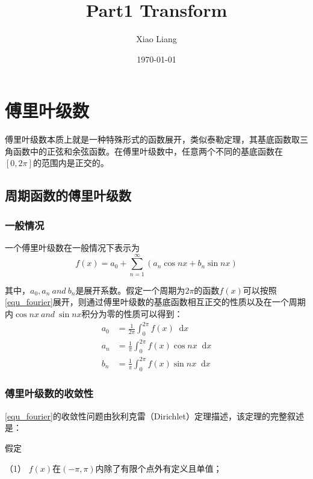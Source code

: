 \documentclass[UTF8,12pt]{ctexart}
\title{Part1 Transform}
\author{Xiao Liang}
\date{\today}
\newcommand*{\dif}{\mathop{}\!\mathrm{d}}
\begin{document}
	\maketitle

	\section{傅里叶级数}
	傅里叶级数本质上就是一种特殊形式的函数展开，类似泰勒定理，其基底函数取三角函数中的正弦和余弦函数。在傅里叶级数中，任意两个不同的基底函数在$ [0,2\pi] $的范围内是正交的。
	
	\subsection{周期函数的傅里叶级数}
	\subsubsection{一般情况}
	
	一个傅里叶级数在一般情况下表示为
	\begin{equation}
		f(x) = a_{0} + \sum_{n=1}^{\infty} (a_{n} \cos nx + b_{n} \sin nx)\label{equ_fourier}
	\end{equation}
	
\noindent 其中，$ a_{0},a_{n} \ and \ b_{n} $是展开系数。假定一个周期为$ 2 \pi $的函数$ f(x) $可以按照\autoref{equ_fourier}展开，则通过傅里叶级数的基底函数相互正交的性质以及在一个周期内$ \cos nx \ and \ \sin nx $积分为零的性质可以得到：
\begin{equation}
	\begin{aligned}
		a_{0} &= \frac{1}{2 \pi} \int_{0}^{2 \pi} f(x) \dif x\\
		a_{n} &= \frac{1}{\pi} \int_{0}^{2 \pi} f(x) \cos nx \dif x\\
		b_{n} &= \frac{1}{\pi} \int_{0}^{2 \pi} f(x) \sin nx \dif x
	\end{aligned}
\end{equation}

	\subsubsection{傅里叶级数的收敛性}
	\autoref{equ_fourier}的收敛性问题由狄利克雷（Dirichlet）定理描述，该定理的完整叙述是：
	
	假定
	
	（1） $ f(x) $在$ (-\pi,\pi) $内除了有限个点外有定义且单值；
	
\end{document}
